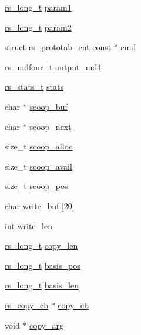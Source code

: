 \begin{DoxyCompactItemize}
\item 
\hyperlink{librsync-config_8h_a6edddd44ca74c10ea65ef82d116e0ffa}{rs\+\_\+long\+\_\+t} \hyperlink{structrs__job_af211b70e91e587c46cd8350c299722f9}{param1}
\item 
\hyperlink{librsync-config_8h_a6edddd44ca74c10ea65ef82d116e0ffa}{rs\+\_\+long\+\_\+t} \hyperlink{structrs__job_a8cb89913609148b6005a8cd5d050b267}{param2}
\item 
struct \hyperlink{structrs__prototab__ent}{rs\+\_\+prototab\+\_\+ent} const $\ast$ \hyperlink{structrs__job_a80708900a8353f78945f9c55336ae156}{cmd}
\item 
\hyperlink{librsync_8h_ad9f85c111de98634e6a28523a266c3df}{rs\+\_\+mdfour\+\_\+t} \hyperlink{structrs__job_a29f5436987f3f517ad6d2dab32540d45}{output\+\_\+md4}
\item 
\hyperlink{librsync_8h_a03dc177b86ff104157b5410afd12de5b}{rs\+\_\+stats\+\_\+t} \hyperlink{structrs__job_ae84dc982a6e97d457d2f5b841256210e}{stats}
\item 
char $\ast$ \hyperlink{structrs__job_a202ce198ebac8c9f4410c19b6eaf954d}{scoop\+\_\+buf}
\item 
char $\ast$ \hyperlink{structrs__job_a129ace01cf9aaad6dce002b23fd06bbb}{scoop\+\_\+next}
\item 
size\+\_\+t \hyperlink{structrs__job_a7ccd19f59c6378dbe92b679456e3a1ec}{scoop\+\_\+alloc}
\item 
size\+\_\+t \hyperlink{structrs__job_ac65cbe513f5b988a5abe64df4f7cda4f}{scoop\+\_\+avail}
\item 
size\+\_\+t \hyperlink{structrs__job_a8a15c3770c99570c3fbf603f58e8b9b8}{scoop\+\_\+pos}
\item 
char \hyperlink{structrs__job_a038caf8e385b0cdfc302ff0f717aa43c}{write\+\_\+buf} \mbox{[}20\mbox{]}
\item 
int \hyperlink{structrs__job_a62bcb053196b1288ddd82ed31a4c0a94}{write\+\_\+len}
\item 
\hyperlink{librsync-config_8h_a6edddd44ca74c10ea65ef82d116e0ffa}{rs\+\_\+long\+\_\+t} \hyperlink{structrs__job_a029dfed2092c7c9f9fe338880eb3a5fe}{copy\+\_\+len}
\item 
\hyperlink{librsync-config_8h_a6edddd44ca74c10ea65ef82d116e0ffa}{rs\+\_\+long\+\_\+t} \hyperlink{structrs__job_a207f22dcb5ddd1624af1c9579e06254d}{basis\+\_\+pos}
\item 
\hyperlink{librsync-config_8h_a6edddd44ca74c10ea65ef82d116e0ffa}{rs\+\_\+long\+\_\+t} \hyperlink{structrs__job_a14f3a4e1db203002bcef60c1a01beffc}{basis\+\_\+len}
\item 
\hyperlink{librsync_8h_afc4bc64a627d7ca181a7e813832313cc}{rs\+\_\+copy\+\_\+cb} $\ast$ \hyperlink{structrs__job_a2653a442bc0c36f8fb9606eb351d8259}{copy\+\_\+cb}
\item 
void $\ast$ \hyperlink{structrs__job_a41a20bd1af91f28decb75c1739756b07}{copy\+\_\+arg}
\end{DoxyCompactItemize}


